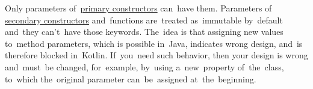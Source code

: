 Only parameters of~\hyperref[kotlinprimaryconstructor]{primary constructors} can~have them.
Parameters of \hyperref[kotlinsecondaryconstructor]{secondary constructors} and~functions are~treated as~immutable
by~default and~they can't~have those keywords.
The~idea is that assigning new values to~method parameters, which is possible in~Java, indicates wrong design, and~is therefore blocked in~Kotlin.
If~you~need such behavior, then your design is wrong and~must~be changed, for~example, by~using a~new~property of~the~class, to~which the~original parameter can~be~assigned at~the~beginning.
